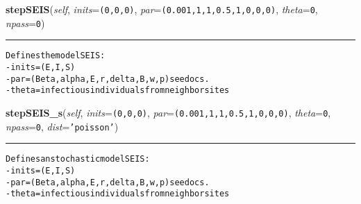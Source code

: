     \vspace{0.5ex}

    \begin{boxedminipage}{\textwidth}

    \raggedright \textbf{stepSEIS}(\textit{self}, \textit{inits}=\texttt{(0,0,0)}, \textit{par}=\texttt{(0.001,1,1,0.5,1,0,0,0)}, \textit{theta}=\texttt{0}, \textit{npass}=\texttt{0})

    \vspace{-1.5ex}

    \rule{\textwidth}{0.5\fboxrule}
\begin{alltt}

Defines the model SEIS:
- inits = (E,I,S)
- par = (Beta, alpha, E,r,delta,B,w,p) see docs.
- theta = infectious individuals from neighbor sites
\end{alltt}

    \vspace{1ex}

    \end{boxedminipage}

    \label{Epigrass:simobj:popmodels:stepSEIS_s}

    \vspace{0.5ex}

    \begin{boxedminipage}{\textwidth}

    \raggedright \textbf{stepSEIS\_s}(\textit{self}, \textit{inits}=\texttt{(0,0,0)}, \textit{par}=\texttt{(0.001,1,1,0.5,1,0,0,0)}, \textit{theta}=\texttt{0}, \textit{npass}=\texttt{0}, \textit{dist}=\texttt{'poisson'})

    \vspace{-1.5ex}

    \rule{\textwidth}{0.5\fboxrule}
\begin{alltt}

Defines an stochastic model SEIS:
- inits = (E,I,S)
- par = (Beta, alpha, E,r,delta,B,w,p) see docs.
- theta = infectious individuals from neighbor sites
\end{alltt}

    \vspace{1ex}

    \end{boxedminipage}

    \label{Epigrass:simobj:popmodels:stepSEIR}

